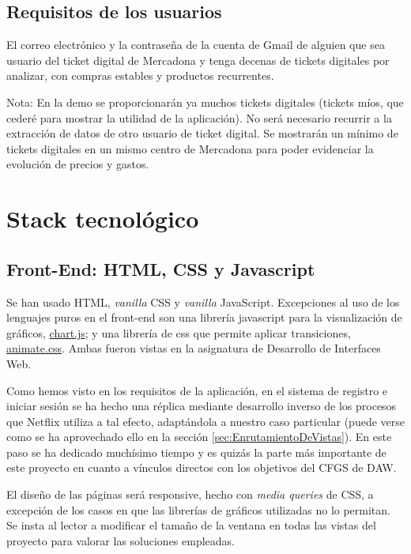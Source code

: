 \documentclass[a4paper,12pt]{report}
\begin{document}
			\subsection{Requisitos de los usuarios}
			
			El correo electrónico y la contraseña de la cuenta de Gmail de alguien que sea usuario del ticket digital de Mercadona y tenga decenas de tickets digitales por analizar, con compras estables y productos recurrentes.
			
			Nota: En la demo se proporcionarán ya muchos tickets digitales (tickets míos, que cederé para mostrar la utilidad de la aplicación). No será necesario recurrir a la extracción de datos de otro usuario de ticket digital. Se mostrarán un mínimo de tickets digitales en un mismo centro de Mercadona para poder evidenciar la evolución de precios y gastos.
			
		
		\section{Stack tecnológico}
	
		
			 \subsection{Front-End: HTML, CSS y Javascript}
			 
			Se han usado HTML, \textit{vanilla} CSS y \textit{vanilla} JavaScript. Excepciones al uso de los lenguajes puros en el front-end son una librería javascript para la visualización de gráficos, \href{https://www.chartjs.org/}{chart.js}\cite{chartjs}; y una librería de css que permite aplicar transiciones, \href{https://animate.style/}{animate.css}\cite{animatecss}. Ambas fueron vistas en la asignatura de Desarrollo de Interfaces Web.
			
			Como hemos visto en los requisitos de la aplicación, en el sistema de registro e iniciar sesión se ha hecho una réplica mediante desarrollo inverso de los procesos que Netflix utiliza a tal efecto, adaptándola a nuestro caso particular (puede verse como se ha aprovechado ello en la sección \ref{sec:EnrutamientoDeVistas}). En este paso se ha dedicado muchísimo tiempo y es quizás la parte más importante de este proyecto en cuanto a vínculos directos con los objetivos del CFGS de DAW.
			
			El diseño de las páginas será responsive, hecho con \textit{media queries} de CSS, a excepción de los casos en que las librerías de gráficos utilizadas no lo permitan. Se insta al lector a modificar el tamaño de la ventana en todas las vistas del proyecto para valorar las soluciones empleadas.
			
\end{document}

